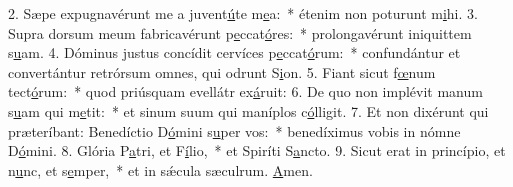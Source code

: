 2. Sæpe expugnavérunt me a juvent\uline{ú}te m\uline{e}a:~* étenim non poturunt m\uline{i}hi.
3. Supra dorsum meum fabricavérunt p\uline{e}ccat\uline{ó}res:~* prolongavérunt iniquittem s\uline{u}am.
4. Dóminus justus concídit cervíces p\uline{e}ccat\uline{ó}rum:~* confundántur et convertántur retrórsum omnes, qui odrunt S\uline{i}on.
5. Fiant sicut f\uline{œ}num tect\uline{ó}rum:~* quod priúsquam evellátr ex\uline{á}ruit:
6. De quo non implévit manum s\uline{u}am qui m\uline{e}tit:~* et sinum suum qui maníplos c\uline{ó}lligit.
7. Et non dixérunt qui præteríbant: Benedíctio D\uline{ó}mini s\uline{u}per vos:~* benedíximus vobis in nómne D\uline{ó}mini.
8. Glória P\uline{a}tri, et F\uline{í}lio,~* et Spiríti S\uline{a}ncto.
9. Sicut erat in princípio, et n\uline{u}nc, et s\uline{e}mper,~* et in sǽcula sæculrum. \uline{A}men.
